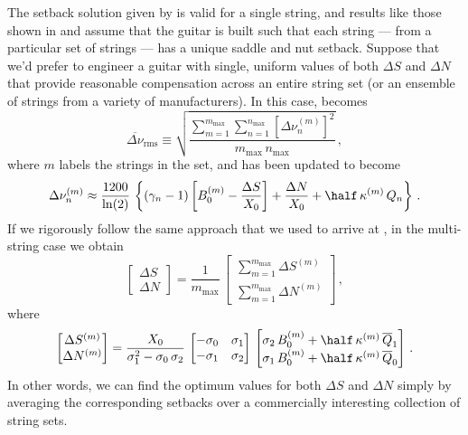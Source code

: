 The setback solution given by  is valid for a single string, and results like those shown in  and  assume that the guitar is built such that each string --- from a particular set of strings --- has a unique saddle and nut setback. Suppose that we'd prefer to engineer a guitar with single, uniform values of both $\Delta S$ and $\Delta N$ that provide reasonable compensation across an entire string set (or an ensemble of strings from a variety of manufacturers). In this case,  becomes
 \begin{equation}\label{eqn:rms_def_m}
\overline{\Delta \nu}_\text{rms} \equiv \sqrt{\frac{\sum_{m = 1}^{m_\text{max}} \sum_{n = 1}^{n_\text{max}} \left[\Delta \nu^{(m)}_{n}\right]^2}{m_\text{max}\, n_\text{max}}}\, ,
 \end{equation}
where $m$ labels the strings in the set, and  has been updated to become
 \begin{equation}\label{eqn:error_tot_m}
\Delta \nu^{(m)}_n \approx \frac{1200}{\ln(2)}\, \left\{ \left(\gamma_n - 1\right) \left[B_0^{(m)} - \frac{\Delta S}{X_0}\right] + \frac{\Delta N}{X_0} + \half\, \kappa^{(m)}\, Q_n \right\}\, .
 \end{equation}
If we rigorously follow the same approach that we used to arrive at , in the multi-string case we obtain
 \begin{equation}\label{eqn:rms_sol_multi}
\begin{bmatrix}
  \Delta S \\
  \Delta N
\end{bmatrix} = \frac{1}{m_\text{max}}\, 
\begin{bmatrix}
  \sum_{m = 1}^{m_\text{max}} \Delta S^{(m)} \\
  \sum_{m = 1}^{m_\text{max}} \Delta N^{(m)}
\end{bmatrix}\, ,
 \end{equation}
where
 \begin{equation}\label{eqn:rms_sol_uni}
\begin{bmatrix}
  \Delta S^{(m)} \\
  \Delta N^{(m)}
\end{bmatrix} = \frac{X_0}{\sigma_1^2 - \sigma_0\, \sigma_2}\,
\begin{bmatrix}
  -\sigma_0 & \sigma_1 \\
  -\sigma_1 & \sigma_2
\end{bmatrix}\,
\begin{bmatrix}
  \sigma_2\, B_0^{(m)} + \half\, \kappa^{(m)}\, \overline{Q}_1 \\
  \sigma_1\, B_0^{(m)} + \half\, \kappa^{(m)}\, \overline{Q}_0
\end{bmatrix}\, .
 \end{equation}
In other words, we can find the optimum values for both $\Delta S$ and $\Delta N$ simply by averaging the corresponding setbacks over a commercially interesting collection of string sets. 